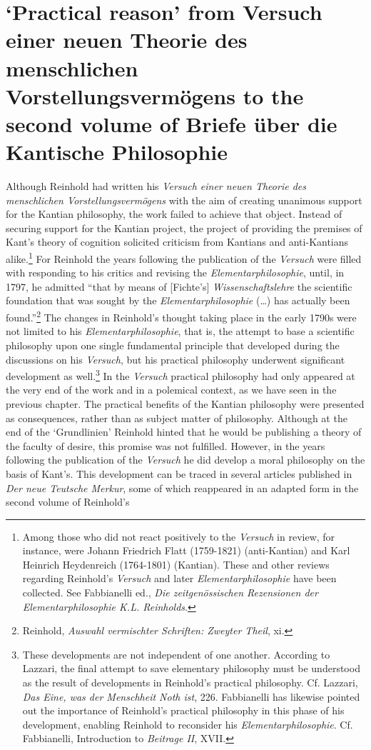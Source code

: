 
\chapter{ `Practical reason' from Versuch einer neuen Theorie des menschlichen Vorstellungsverm\"{o}gens to the second volume of Briefe \"{u}ber die Kantische Philosophie}


Although Reinhold had written his \textit{Versuch einer neuen Theorie des menschlichen Vorstellungsverm\"{o}gens }with the aim of creating unanimous support for the Kantian philosophy, the work failed to achieve that object. Instead of securing support for the Kantian project, the project of providing the premises of Kant's theory of cognition solicited criticism from Kantians and anti{-}Kantians alike.\footnote{ Among those who did not react positively to the \textit{Versuch} in review, for instance, were Johann Friedrich Flatt (1759{-}1821) (anti{-}Kantian) and Karl Heinrich Heydenreich (1764{-}1801) (Kantian). These and other reviews regarding Reinhold's \textit{Versuch} and later \textit{Elementarphilosophie} have been collected. See Fabbianelli ed., \textit{Die zeitgen\"{o}ssischen Rezensionen der Elementarphilosophie K.L. Reinholds}. } For Reinhold the years following the publication of the \textit{Versuch} were filled with responding to his critics and revising the \textit{Elementarphilosophie}, until, in 1797, he admitted ``that by means of [Fichte's] \textit{Wissenschaftslehre} the scientific foundation that was sought by the \textit{Elementarphilosophie }(\ldots ) has actually been found.''\footnote{ Reinhold, \textit{Auswahl vermischter Schriften: Zweyter Theil}, xi. } The changes in Reinhold's thought taking place in the early 1790s were not limited to his \textit{Elementarphilosophie}, that is, the attempt to base a scientific philosophy upon one single fundamental principle that developed during the discussions on his \textit{Versuch}, but his practical philosophy underwent significant development as well.\footnote{ These developments are not independent of one another. According to Lazzari, the final attempt to save elementary philosophy must be understood as the result of developments in Reinhold's practical philosophy. Cf. Lazzari, \textit{Das Eine, was der Menschheit Noth ist}, 226. Fabbianelli has likewise pointed out the importance of Reinhold's practical philosophy in this phase of his development, enabling Reinhold to reconsider his \textit{Elementarphilosophie}. Cf. Fabbianelli, Introduction to \textit{Beitrage II}, XVII. } In the \textit{Versuch} practical philosophy had only appeared at the very end of the work and in a polemical context, as we have seen in the previous chapter. The practical benefits of the Kantian philosophy were presented as consequences, rather than as subject matter of philosophy. Although at the end of the `Grundlinien' Reinhold hinted that he would be publishing a theory of the faculty of desire, this promise was not fulfilled. However, in the years following the publication of the \textit{Versuch} he did develop a moral philosophy on the basis of Kant's. This development can be traced in several articles published in \textit{Der neue Teutsche Merkur}, some of which reappeared in an adapted form in the second volume of Reinhold's 